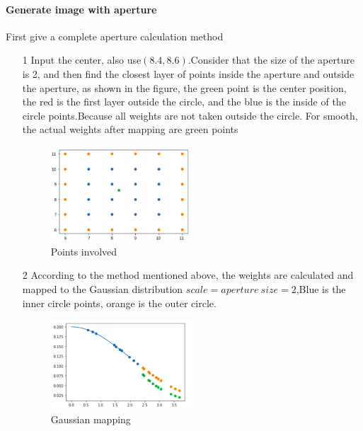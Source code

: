 \documentclass[letterpaper,12pt]{article}
\begin{document}
\paragraph{Generate image with aperture}
First give a complete aperture calculation method
\begin{itemize}
	\item[1]Input the center, also use$(8.4,8.6)$.Consider that the size of the aperture is 2, and then find the closest layer of points inside the aperture and outside the aperture, as shown in the figure, the green point is the center position, the red is the first layer outside the circle, and the blue is the inside of the circle points.Because all weights are not taken outside the circle. For smooth, the actual weights after mapping are green points
	\begin{figure}[h]
		\centering 
		\includegraphics[width=0.5\textwidth]{Image/center.png}
		\caption{Points involved}
	\end{figure}
	\item[2]According to the method mentioned above, the weights are calculated and mapped to the Gaussian distribution $ scale = aperture\ size =2$,Blue is the inner circle points, orange is the outer circle.
	\begin{figure}[h]
	\centering 
	\includegraphics[width=0.5\textwidth]{Image/weight.png}
	\caption{Gaussian mapping}
	\end{figure}


\end{itemize}
\end{document}
